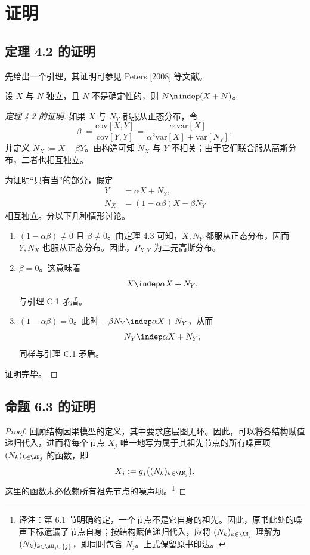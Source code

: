 \chapter{证明}
\label{app:proofs}
\section{定理 4.2 的证明}
先给出一个引理，其证明可参见 Peters [2008] 等文献。
\begin{lemma}
设 $X$ 与 $N$ 独立，且 $N$ 不是确定性的，则 $N\nindep(X+N)$。
\end{lemma}
\begin{proof}[定理 4.2 的证明]
如果 $X$ 与 $N_Y$ 都服从正态分布，令
\[\beta:=\frac{\mathrm{cov}[X,Y]}{\mathrm{cov}[Y,Y]}
=\frac{\alpha\,\mathrm{var}[X]}{\alpha^2\mathrm{var}[X]+\mathrm{var}[N_Y]},\]
并定义 $N_X:=X-\beta Y$。由构造可知 $N_X$ 与 $Y$ 不相关；由于它们联合服从高斯分布，二者也相互独立。

为证明“只有当”的部分，假定
\[\begin{aligned}Y&=\alpha X+N_Y,\\N_X&=(1-\alpha\beta)X-\beta N_Y\end{aligned}\]
相互独立。分以下几种情形讨论。
\begin{enumerate}[label=(\roman*)]
\item $(1-\alpha\beta)\ne0$ 且 $\beta\ne0$。由定理 4.3 可知，$X,N_Y$ 都服从正态分布，因而 $Y,N_X$ 也服从正态分布。因此，$P_{X,Y}$ 为二元高斯分布。
\item $\beta=0$。这意味着
\[X\indep\alpha X+N_Y,\]
与引理 C.1 矛盾。
\item $(1-\alpha\beta)=0$。此时 $-\beta N_Y\indep\alpha X+N_Y$，从而
\[N_Y\indep\alpha X+N_Y,\]
同样与引理 C.1 矛盾。
\end{enumerate}
证明完毕。
\end{proof}

\Needspace{4.4cm}
\section{命题 6.3 的证明}
\begin{proof}
回顾结构因果模型的定义，其中要求底层图无环。因此，可以将各结构赋值递归代入，进而将每个节点 $X_j$ 唯一地写为属于其祖先节点的所有噪声项 $(N_k)_{k\in\AN_j}$ 的函数，即
\[X_j:=g_j\big((N_k)_{k\in\AN_j}\big).\]
这里的函数未必依赖所有祖先节点的噪声项。\footnote{译注：第 6.1 节明确约定，一个节点不是它自身的祖先。因此，原书此处的噪声下标遗漏了节点自身；按结构赋值递归代入，应将 $(N_k)_{k\in\AN_j}$ 理解为 $(N_k)_{k\in\AN_j\cup\{j\}}$，即同时包含 $N_j$。上式保留原书印法。}
\end{proof}

